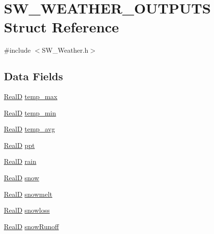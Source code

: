 \hypertarget{struct_s_w___w_e_a_t_h_e_r___o_u_t_p_u_t_s}{}\section{S\+W\+\_\+\+W\+E\+A\+T\+H\+E\+R\+\_\+\+O\+U\+T\+P\+U\+TS Struct Reference}
\label{struct_s_w___w_e_a_t_h_e_r___o_u_t_p_u_t_s}


{\ttfamily \#include $<$S\+W\+\_\+\+Weather.\+h$>$}

\subsection*{Data Fields}
\begin{DoxyCompactItemize}
\item 
\hyperlink{generic_8h_af1c105fd5732f70b91ddaeda0cc340e3}{RealD} \hyperlink{struct_s_w___w_e_a_t_h_e_r___o_u_t_p_u_t_s_a5b2247f11a4f701e4d8c4ce2efae48c0}{temp\+\_\+max}
\item 
\hyperlink{generic_8h_af1c105fd5732f70b91ddaeda0cc340e3}{RealD} \hyperlink{struct_s_w___w_e_a_t_h_e_r___o_u_t_p_u_t_s_adb824c9208853bdc6bc1dfeff9abf96f}{temp\+\_\+min}
\item 
\hyperlink{generic_8h_af1c105fd5732f70b91ddaeda0cc340e3}{RealD} \hyperlink{struct_s_w___w_e_a_t_h_e_r___o_u_t_p_u_t_s_a29fe7299188b0b52fd3faca4f90c7675}{temp\+\_\+avg}
\item 
\hyperlink{generic_8h_af1c105fd5732f70b91ddaeda0cc340e3}{RealD} \hyperlink{struct_s_w___w_e_a_t_h_e_r___o_u_t_p_u_t_s_ae8c1b34a0bba9e0ec69c114424347887}{ppt}
\item 
\hyperlink{generic_8h_af1c105fd5732f70b91ddaeda0cc340e3}{RealD} \hyperlink{struct_s_w___w_e_a_t_h_e_r___o_u_t_p_u_t_s_a89d70017d876b664f263aeae244d84e0}{rain}
\item 
\hyperlink{generic_8h_af1c105fd5732f70b91ddaeda0cc340e3}{RealD} \hyperlink{struct_s_w___w_e_a_t_h_e_r___o_u_t_p_u_t_s_a4069e1bd430c99c389f2a4436aa9517b}{snow}
\item 
\hyperlink{generic_8h_af1c105fd5732f70b91ddaeda0cc340e3}{RealD} \hyperlink{struct_s_w___w_e_a_t_h_e_r___o_u_t_p_u_t_s_a2b6f14f8fd6fdc71673585f055bb0ffd}{snowmelt}
\item 
\hyperlink{generic_8h_af1c105fd5732f70b91ddaeda0cc340e3}{RealD} \hyperlink{struct_s_w___w_e_a_t_h_e_r___o_u_t_p_u_t_s_aa1c2aa2720f18d44b1e5a2a6373423ee}{snowloss}
\item 
\hyperlink{generic_8h_af1c105fd5732f70b91ddaeda0cc340e3}{RealD} \hyperlink{struct_s_w___w_e_a_t_h_e_r___o_u_t_p_u_t_s_a58a83baf91ef77a8f1c224f691277c8a}{snow\+Runoff}

\end{DoxyCompactItemize}
